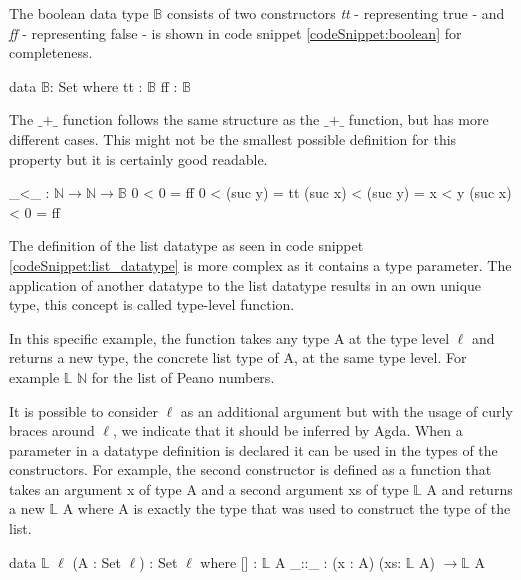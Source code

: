 The boolean data type $\mathbb{B}$ consists of two constructors \emph{tt} - representing true - and \emph{ff} - representing false - is shown in code snippet \ref{codeSnippet:boolean} for completeness.

\begin{codesnippet}[mathescape=true, caption={Definition of the boolean data type in Agda}, label={codeSnippet:boolean}]
data $\mathbb{B}$: Set where
  tt : $\mathbb{B}$
  ff  : $\mathbb{B}$
\end{codesnippet}

The $\text{\_+\_}$ function follows the same structure as the $\text{\_+\_}$ function, but has more different cases. 
This might not be the smallest possible definition for this property but it is certainly good readable.

\begin{codesnippet}[mathescape=true, caption={Peano numbers less-than}, label={codeSnippet:natural_number_less_than}]
_<_ : $\mathbb{N} \rightarrow \mathbb{N} \rightarrow \mathbb{B}$
0 < 0 = ff
0 < (suc y) = tt
(suc x) < (suc y) = x < y
(suc x) < 0 = ff
\end{codesnippet}

The definition of the list datatype as seen in code snippet \ref{codeSnippet:list_datatype} is more complex as it contains a type parameter. The application of another datatype to the list datatype results in an own unique type, this concept is called type-level function. 

In this specific example, the function takes any type A at the type level $\ell$ and returns a new type, the concrete list type of A, at the same type level.
For example $\mathbb{L}$ $\mathbb{N}$ for the list of Peano numbers.

It is possible to consider $\ell$ as an additional argument but with the usage of curly braces around $\ell$, we indicate that it should be inferred by Agda.
When a parameter in a datatype definition is declared it can be used in the types of the constructors. 
For example, the second constructor is defined as a function that takes an argument x of type A and a second argument xs of type $\mathbb{L}$ A and returns a new $\mathbb{L}$ A where A is exactly the type that was used to construct the type of the list.
\begin{codesnippet}[mathescape=true, caption={Definition of the list datatype in Agda}, label={codeSnippet:list_datatype}]
data $\mathbb{L}$ {$\ell$} (A : Set $\ell$) : Set $\ell$ where
  [] : $\mathbb{L}$ A
  _::_ : (x : A) (xs: $\mathbb{L}$ A) $\rightarrow \mathbb{L}$ A
\end{codesnippet}

